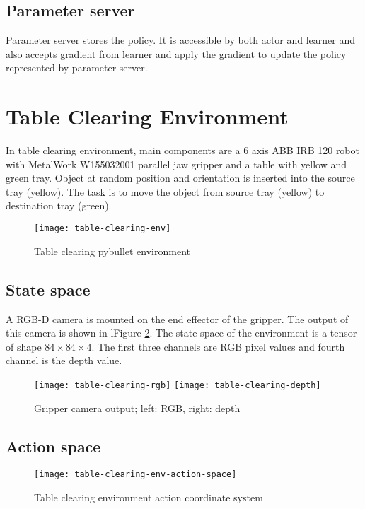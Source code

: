 \subsection{Parameter server}
Parameter server stores the policy. It is accessible by both actor and learner and also accepts gradient from learner and apply the gradient to update the policy represented by parameter server.

\section{Table Clearing Environment}
In table clearing environment, main components are a 6 axis ABB IRB 120 robot with MetalWork W155032001 parallel jaw gripper and a table with yellow and green tray. Object at random position and orientation is inserted into the source tray (yellow). The task is to move the object from source tray (yellow) to destination tray (green).

\begin{figure}[H]
	\centering
	\texttt{[image: table-clearing-env]}
	\caption{Table clearing pybullet environment}
	\label{fig:table-clearing-env}
\end{figure}

\subsection{State space}
A RGB-D camera is mounted on the end effector of the gripper. The output of this camera is shown in lFigure \ref{fig:fig:table-clearing-env-camera}. The state space of the environment is a tensor of shape $84 \times 84 \times 4$. The first three channels are RGB pixel values and fourth channel is the depth value.

\begin{figure}[H]
	\centering
	\texttt{[image: table-clearing-rgb]}
	\texttt{[image: table-clearing-depth]}
	\caption{Gripper camera output; left: RGB, right: depth}
	\label{fig:fig:table-clearing-env-camera}
\end{figure}

\subsection{Action space}
\begin{figure}[H]
	\centering
	\texttt{[image: table-clearing-env-action-space]}
	\caption{Table clearing environment action coordinate system}
	\label{fig:table-clearing-env-action-space}
\end{figure}

